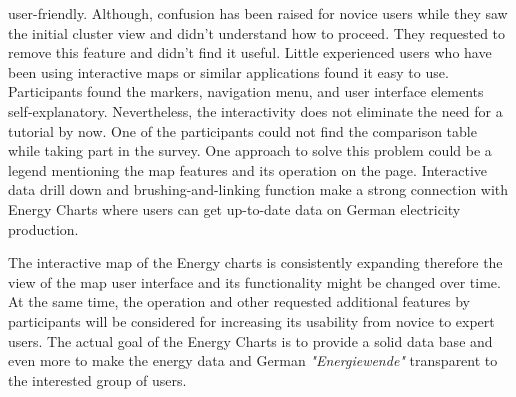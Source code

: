 user-friendly. Although, confusion has been raised for novice users while they saw the initial cluster view and didn’t understand how to proceed. They requested to remove this feature and didn’t find it useful. Little experienced users who have been using interactive maps or similar applications found it easy to use. Participants found the markers, navigation menu, and user interface elements self-explanatory. Nevertheless, the interactivity does not eliminate the need for a tutorial by now. One of the participants could not find the comparison table while taking part in the survey. One approach to solve this problem could be a legend mentioning the map features and its operation on the page. Interactive data drill down and brushing-and-linking function make a strong connection with Energy Charts where users can get up-to-date data on German electricity production. 

The interactive map of the Energy charts is consistently expanding therefore the view of the map user interface and its functionality might be changed over time. At the same time, the operation and other requested additional features by participants will be considered for increasing its usability from novice to expert users. The actual goal of the Energy Charts is to provide a solid data base and even more to make the energy data and German \textit{"Energiewende"} transparent to the interested group of users.  

